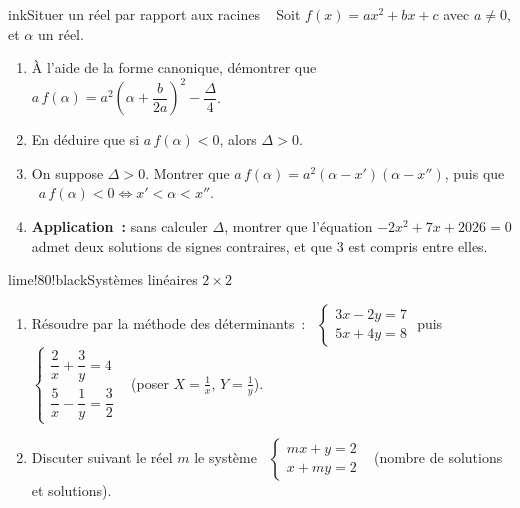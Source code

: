 \begin{exo}{ink}{Situer un réel par rapport aux racines \demo\ }
Soit $f(x)=ax^2+bx+c$ avec $a\neq0$, et $\alpha$ un réel.
\begin{enumerate}
  \item À l'aide de la forme canonique, démontrer que \ $a\,f(\alpha)=a^2\left(\alpha+\dfrac b{2a}\right)^2-\dfrac{\Delta}{4}$.
  \item En déduire que si $a\,f(\alpha)<0$, alors $\Delta>0$.
  \item On suppose $\Delta>0$. Montrer que $a\,f(\alpha)=a^2(\alpha-x')(\alpha-x'')$, puis que \ $a\,f(\alpha)<0 \iff x'<\alpha<x''$.
  \item \textbf{Application~:} sans calculer $\Delta$, montrer que l'équation $-2x^2+7x+2026=0$ admet deux solutions de signes contraires, et que $3$ est compris entre elles.
\end{enumerate}
\end{exo}


\begin{exo}{lime!80!black}{Systèmes linéaires $2\times2$ }
\begin{enumerate}
  \item Résoudre par la méthode des déterminants~: \ $\begin{cases}3x-2y=7\\5x+4y=8\end{cases}$ \quad puis \quad $\begin{cases}\dfrac2x+\dfrac3y=4\\[4pt]\dfrac5x-\dfrac1y=\dfrac32\end{cases}$ \ {\small(poser $X=\frac1x$, $Y=\frac1y$)}.
  \item Discuter suivant le réel $m$ le système \ $\begin{cases}mx+y=2\\x+my=2\end{cases}$ \ (nombre de solutions et solutions).
\end{enumerate}
\end{exo}

